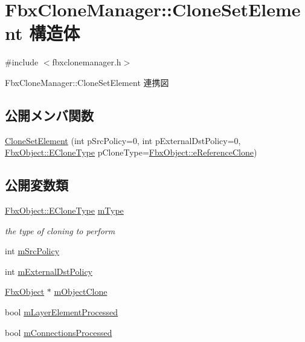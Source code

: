 \hypertarget{struct_fbx_clone_manager_1_1_clone_set_element}{}\section{Fbx\+Clone\+Manager\+:\+:Clone\+Set\+Element 構造体}
\label{struct_fbx_clone_manager_1_1_clone_set_element}


{\ttfamily \#include $<$fbxclonemanager.\+h$>$}



Fbx\+Clone\+Manager\+:\+:Clone\+Set\+Element 連携図
\subsection*{公開メンバ関数}
\begin{DoxyCompactItemize}
\item 
\hyperlink{struct_fbx_clone_manager_1_1_clone_set_element_a28893cc8fb14daf0f134760a6d06a475}{Clone\+Set\+Element} (int p\+Src\+Policy=0, int p\+External\+Dst\+Policy=0, \hyperlink{class_fbx_object_a9f5626b2d2135684d6ea1e6e4ad2acbb}{Fbx\+Object\+::\+E\+Clone\+Type} p\+Clone\+Type=\hyperlink{class_fbx_object_a9f5626b2d2135684d6ea1e6e4ad2acbbae681cda4dccb3f5ccf260e5ccc47d88c}{Fbx\+Object\+::e\+Reference\+Clone})
\end{DoxyCompactItemize}
\subsection*{公開変数類}
\begin{DoxyCompactItemize}
\item 
\hyperlink{class_fbx_object_a9f5626b2d2135684d6ea1e6e4ad2acbb}{Fbx\+Object\+::\+E\+Clone\+Type} \hyperlink{struct_fbx_clone_manager_1_1_clone_set_element_a387497db4d5a0764a947835e5b234393}{m\+Type}
\begin{DoxyCompactList}\small\item\em the type of cloning to perform \end{DoxyCompactList}\item 
int \hyperlink{struct_fbx_clone_manager_1_1_clone_set_element_a0619286ee827ce3e9adcb8914c4af9f1}{m\+Src\+Policy}
\item 
int \hyperlink{struct_fbx_clone_manager_1_1_clone_set_element_aeb430f3dba7d9b522b707c564b04b31d}{m\+External\+Dst\+Policy}
\item 
\hyperlink{class_fbx_object}{Fbx\+Object} $\ast$ \hyperlink{struct_fbx_clone_manager_1_1_clone_set_element_a05f2720efbbcf01591be1f0c770d1004}{m\+Object\+Clone}
\item 
bool \hyperlink{struct_fbx_clone_manager_1_1_clone_set_element_a496dc6c392d9e9db4ef65094bd03d0e5}{m\+Layer\+Element\+Processed}
\item 
bool \hyperlink{struct_fbx_clone_manager_1_1_clone_set_element_a5595fee76a6c3736d11b5c6b2702133b}{m\+Connections\+Processed}
\end{DoxyCompactItemize}


